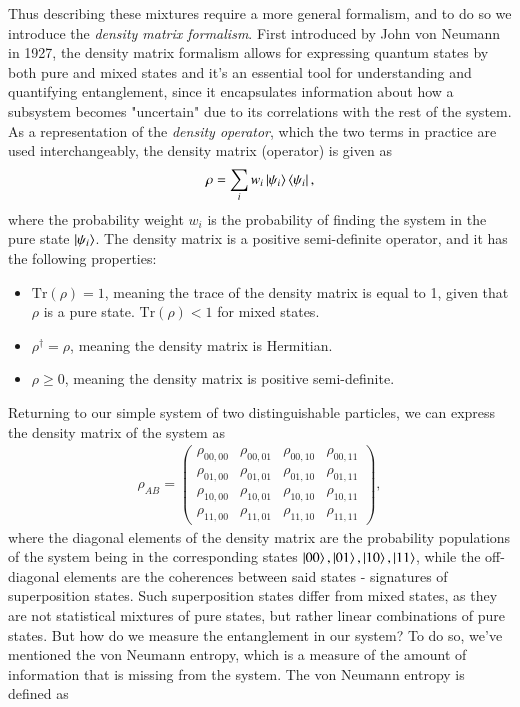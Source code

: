 \documentclass{subfiles}
\begin{document}
Thus describing these mixtures require a more general formalism, and to do so we introduce the \emph{density matrix formalism}. First introduced by John von Neumann in 1927\cite{neumann1927}, the density matrix formalism allows for expressing quantum states by both pure and mixed states and it's an essential tool for understanding and quantifying entanglement, since it encapsulates information about how a subsystem becomes "uncertain" due to its correlations with the rest of the system. As a representation of the \emph{density operator}, which the two terms in practice are used interchangeably, the density matrix (operator) is given as
\begin{equation}
    \rho = \sum_i w_i\ket{\psi_i}\bra{\psi_i}\label{eq:density_matrix},
\end{equation}
where the probability weight $w_i$ is the probability of finding the system in the pure state $\ket{\psi_i}$. The density matrix is a positive semi-definite operator, and it has the following properties:
\begin{itemize}
    \item $\text{Tr}(\rho) = 1$, meaning the trace of the density matrix is equal to 1, given that $\rho$ is a pure state. $\text{Tr}(\rho) < 1$ for mixed states.
    \item $\rho^\dagger = \rho$, meaning the density matrix is Hermitian.
    \item $\rho \geq 0$, meaning the density matrix is positive semi-definite.
\end{itemize}
Returning to our simple system of two distinguishable particles, we can express the density matrix of the system as
\begin{align*}
    \rho_{AB} = \begin{pmatrix}
        \rho_{00, 00} & \rho_{00, 01} & \rho_{00, 10} & \rho_{00, 11} \\
        \rho_{01, 00} & \rho_{01, 01} & \rho_{01, 10} & \rho_{01, 11} \\
        \rho_{10, 00} & \rho_{10, 01} & \rho_{10, 10} & \rho_{10, 11} \\
        \rho_{11, 00} & \rho_{11, 01} & \rho_{11, 10} & \rho_{11, 11}
    \end{pmatrix},
\end{align*}
where the diagonal elements of the density matrix are the probability populations of the system being in the corresponding states $\ket{00}, \ket{01}, \ket{10}, \ket{11}$, while the off-diagonal elements are the coherences between said states - signatures of superposition states. Such superposition states differ from mixed states, as they are not statistical mixtures of pure states, but rather linear combinations of pure states. But how do we measure the entanglement in our system? To do so, we've mentioned the von Neumann entropy, which is a measure of the amount of information that is missing from the system. The von Neumann entropy is defined as \cite{nielsen2010quantum}
\end{document}
